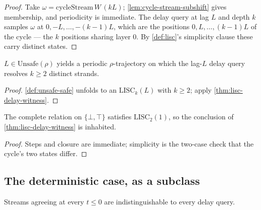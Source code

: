 \begin{proof}
  \leanok
  Take $\omega = \mathrm{cycleStream}\,W\,(kL)$; \ref{lem:cycle-stream-subshift}
  gives membership, and periodicity is immediate. The delay query at lag $L$ and
  depth $k$ samples $\omega$ at $0, -L, \dots, -(k-1)L$, which are the positions
  $0, L, \dots, (k-1)L$ of the cycle --- the $k$ positions sharing layer $0$. By
  \ref{def:lisc}'s simplicity clause these carry distinct states.
\end{proof}

\begin{corollary}
  \label{cor:unsafe-delay}
  \leanok
  $L \in \mathrm{Unsafe}(\rho)$ yields a periodic $\rho$-trajectory on which
  the lag-$L$ delay query resolves $k \geq 2$ distinct strands.
\end{corollary}

\begin{proof}
  \leanok
  \ref{def:unsafe-safe} unfolds to an $\mathrm{LISC}_k(L)$ with $k \geq 2$;
  apply \ref{thm:lisc-delay-witness}.
\end{proof}

\begin{lemma}
  \label{lem:lisc-inhabited}
  \leanok
  The complete relation on $\{\bot,\top\}$ satisfies $\mathrm{LISC}_2(1)$, so
  the conclusion of \ref{thm:lisc-delay-witness} is inhabited.
\end{lemma}

\begin{proof}
  \leanok
  Steps and closure are immediate; simplicity is the two-case check that the
  cycle's two states differ.
\end{proof}

\subsection{The deterministic case, as a subclass}

\begin{lemma}
  \label{lem:delay-nonpos}
  \leanok
  Streams agreeing at every $t \leq 0$ are indistinguishable to every delay
  query.
\end{lemma}


